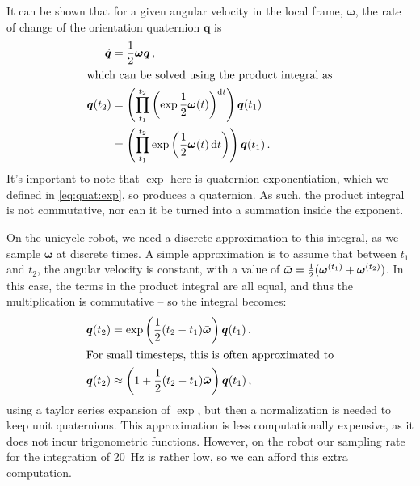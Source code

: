 \documentclass[main.tex]{subfiles}
\begin{document}
	It can be shown that for a given angular velocity in the local frame, $\bm{\omega}$, the rate of change of the orientation quaternion $\bm{q}$ is \cite[p.~10]{boyle2016integration}
	\begin{align}
		\dot{\bm{q}} &= \frac{1}{2}\bm{\omega}\bm{q}\,, \\
	\intertext{which can be solved using the product integral as}
		\bm{q}(t_2)
			&= \left(\prod_{t_1}^{t_2} \left(\exp {\frac{1}{2}\bm{\omega}(t)}\right)^{\mathop{}\!\mathrm{d} t}\right) \bm{q}(t_1) \\
			&= \left(\prod_{t_1}^{t_2} \exp \left({\frac{1}{2}\bm{\omega}(t)} \mathop{}\!\mathrm{d} t\right)\right) \bm{q}(t_1)\,.
	\end{align}
	It's important to note that $\exp$ here is quaternion exponentiation, which we defined in \cref{eq:quat:exp}, so produces a quaternion.
	As such, the product integral is not commutative, nor can it be turned into a summation inside the exponent.

	On the unicycle robot, we need a discrete approximation to this integral, as we sample $\bm{\omega}$ at discrete times.
	A simple approximation is to assume that between $t_1$ and $t_2$, the angular velocity is constant, with a value of $\bar{\bm{\omega}} = \frac{1}{2}(\bm{\omega}^{(t_1)} + \bm{\omega}^{(t_2)})$.
	In this case, the terms in the product integral are all equal, and thus the multiplication is commutative -- so the integral becomes:
	\begin{align}
		\bm{q}(t_2)
			&= \exp \left(
				\frac{1}{2} (t_2 - t_1) \bar{\bm{\omega}}
			\right) \bm{q}(t_1)\,.
		\\
	\intertext{For small timesteps, this is often approximated to}
		\bm{q}(t_2)
			&\approx \left(1 + \frac{1}{2} (t_2 - t_1) \bar{\bm{\omega}}\right) \bm{q}(t_1)\,,
	\end{align}
	using a taylor series expansion of $\exp$, but then a normalization is needed to keep unit quaternions.
	This approximation is less computationally expensive, as it does not incur trigonometric functions.
	However, on the robot our sampling rate for the integration of \SI{20}{\hertz} is rather low, so we can afford this extra computation.

\bib
\end{document}
